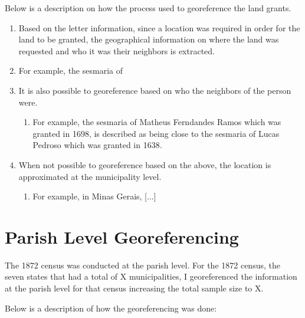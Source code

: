 \documentclass{article}
\begin{document}
Below is a description on how the process used to georeference the land grants.

\begin{enumerate}
  \item Based on the letter information, since a location was required in order for the land to be granted, the geographical information on where the land was requested and who it was their neighbors is extracted.
  \item For example, the sesmaria of 
  \item It is also possible to georeference based on who the neighbors of the person were. 
  \begin{enumerate}
    \item For example, the sesmaria of Matheus Ferndandes Ramos which was granted in 1698, is described as being close to the sesmaria of Lucas Pedroso which was granted in 1638. 
  \end{enumerate}
  \item When not possible to georeference based on the above, the location is approximated at the municipality level. 
  \begin{enumerate}
    \item For example, in Minas Gerais, [...]
  \end{enumerate}
\end{enumerate}

\clearpage

\section{Parish Level Georeferencing}
\label{app:georeferencing_parishes}

The 1872 census was conducted at the parish level. For the 1872 census, the seven states that had a total of X municipalities, I georeferenced the information at the parish level for that census increasing the total sample size to X.

Below is a description of how the georeferencing was done:
\end{document}
